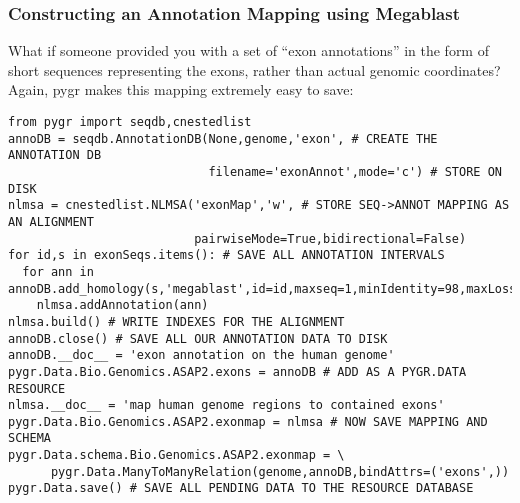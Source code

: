 \documentclass{howto}
\begin{document}
\subsubsection{Constructing an Annotation Mapping using Megablast}
What if someone provided you with a set of ``exon annotations'' in the form
of short sequences representing the exons, rather than actual genomic
coordinates?  Again, pygr makes this mapping extremely easy to save:
\begin{verbatim}
from pygr import seqdb,cnestedlist
annoDB = seqdb.AnnotationDB(None,genome,'exon', # CREATE THE ANNOTATION DB
                            filename='exonAnnot',mode='c') # STORE ON DISK
nlmsa = cnestedlist.NLMSA('exonMap','w', # STORE SEQ->ANNOT MAPPING AS AN ALIGNMENT
                          pairwiseMode=True,bidirectional=False)
for id,s in exonSeqs.items(): # SAVE ALL ANNOTATION INTERVALS
  for ann in annoDB.add_homology(s,'megablast',id=id,maxseq=1,minIdentity=98,maxLoss=2):
    nlmsa.addAnnotation(ann)
nlmsa.build() # WRITE INDEXES FOR THE ALIGNMENT
annoDB.close() # SAVE ALL OUR ANNOTATION DATA TO DISK
annoDB.__doc__ = 'exon annotation on the human genome'
pygr.Data.Bio.Genomics.ASAP2.exons = annoDB # ADD AS A PYGR.DATA RESOURCE
nlmsa.__doc__ = 'map human genome regions to contained exons'
pygr.Data.Bio.Genomics.ASAP2.exonmap = nlmsa # NOW SAVE MAPPING AND SCHEMA
pygr.Data.schema.Bio.Genomics.ASAP2.exonmap = \
      pygr.Data.ManyToManyRelation(genome,annoDB,bindAttrs=('exons',))
pygr.Data.save() # SAVE ALL PENDING DATA TO THE RESOURCE DATABASE
\end{verbatim}
\end{document}
